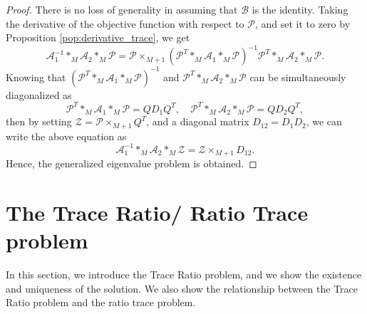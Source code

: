 \documentclass{siamltex}
\begin{document}
\begin{proof}
There is no loss of generality in assuming that $\mathcal{B}$ is the identity. Taking the derivative of the objective function with respect to $\mathcal{P}$, and set it to zero by Proposition \ref{pop:derivative_trace}, we get
$$ \mathcal{A}_1^{-1} *_M \mathcal{A}_2 *_M \mathcal{P}=\mathcal{P} \times_{M+1} (\mathcal{P}^T *_M \mathcal{A}_1 *_M \mathcal{P})^{-1} \mathcal{P}^T *_M \mathcal{A}_2 *_M \mathcal{P}.$$
Knowing that $\left(\mathcal{P}^T *_M \mathcal{A}_1 *_M \mathcal{P}\right)^{-1}$ and $\mathcal{P}^T *_M \mathcal{A}_2 *_M \mathcal{P}$ can be simultaneously diagonalized as
$$\mathcal{P}^T *_M \mathcal{A}_1 *_M \mathcal{P}=Q D_1 Q^T, \quad \mathcal{P}^T *_M \mathcal{A}_2 *_M \mathcal{P}=Q D_2 Q^T,$$ 
then by setting $\mathcal{Z}=\mathcal{P} \times_{M+1} Q^T$, and a diagonal matrix $D_{12}=D_1 D_2$, we can write the above equation as
$$
\mathcal{A}_1^{-1} *_M \mathcal{A}_2 *_M \mathcal{Z} =\mathcal{Z} \times_{M+1} D_{12}.$$
Hence, the generalized eigenvalue problem is obtained.
\end{proof}

\section{The Trace Ratio/ Ratio Trace problem}\label{sec:trace_ratio}
In this section, we introduce the Trace Ratio problem, and we show the existence and uniqueness of the solution. We also show the relationship between the Trace Ratio problem and the ratio trace problem.
\end{document}
